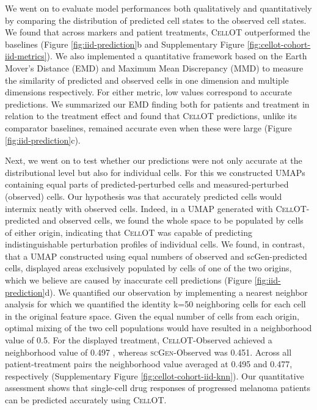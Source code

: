 We went on to evaluate model performances both qualitatively and quantitatively by comparing the distribution of predicted cell states to the observed cell states.
We found that across markers and patient treatments, \textsc{CellOT} outperformed the baselines (Figure \ref{fig:iid-prediction}b and Supplementary Figure \ref{fig:cellot-cohort-iid-metrics}).
We also implemented a quantitative framework based on the Earth Mover’s Distance (EMD) \cite{villani2009} and Maximum Mean Discrepancy (MMD) \cite{gretton2012} to measure the similarity of predicted and observed cells in one dimension and multiple dimensions respectively.
For either metric, low values correspond to accurate predictions.
We summarized our EMD finding both for patients and treatment in relation to the treatment effect and found that \textsc{CellOT} predictions, unlike its comparator baselines, remained accurate even when these were large (Figure \ref{fig:iid-prediction}c).  

Next, we went on to test whether our predictions were not only accurate at the distributional level but also for individual cells.
For this we constructed UMAPs containing equal parts of predicted-perturbed cells and measured-perturbed (observed) cells.
Our hypothesis was that accurately predicted cells would intermix neatly with observed cells.
Indeed, in a UMAP generated with \textsc{CellOT}-predicted and observed cells, we found the whole space to be populated by cells of either origin, indicating that \textsc{CellOT} was capable of predicting indistinguishable perturbation profiles of individual cells.
We found, in contrast, that a UMAP constructed using equal numbers of observed and scGen-predicted cells, displayed areas exclusively populated by cells of one of the two origins, which we believe are caused by inaccurate cell predictions (Figure \ref{fig:iid-prediction}d).
We quantified our observation by implementing a nearest neighbor analysis for which we quantified the identity k=50 neighboring cells for each cell in the original feature space.
Given the equal number of cells from each origin, optimal mixing of the two cell populations would have resulted in a neighborhood value of 0.5. For the displayed treatment, \textsc{CellOT}-Observed achieved a neighborhood value of 0.497 , whereas \textsc{scGen}-Observed was 0.451.
Across all patient-treatment pairs the neighborhood value averaged at 0.495 and 0.477, respectively (Supplementary Figure \ref{fig:cellot-cohort-iid-knn}).
Our quantitative assessment shows that single-cell drug responses of progressed melanoma patients can be predicted accurately using \textsc{CellOT}. 

